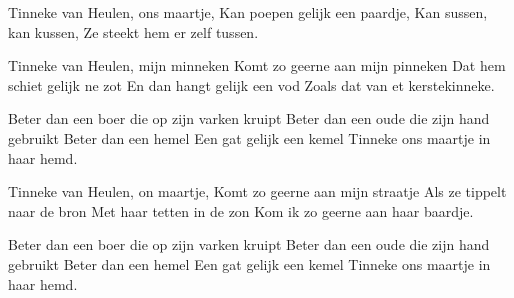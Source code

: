 \footnotemark [
ititle={Tinneke van Heulen}]


\beginverse
Tinneke van Heulen, ons maartje,
Kan poepen gelijk een paardje,
Kan sussen, kan kussen,
Ze steekt hem er zelf tussen.
\endverse

\beginverse
Tinneke van Heulen, mijn minneken
Komt zo geerne aan mijn pinneken
Dat hem schiet gelijk ne zot
En dan hangt gelijk een vod
Zoals dat van et kerstekinneke.
\endverse

\beginverse
Beter dan een boer die op zijn varken kruipt
Beter dan een oude die zijn hand gebruikt
Beter dan een hemel
Een gat gelijk een kemel
Tinneke ons maartje in haar hemd.
\endverse

\beginverse
Tinneke van Heulen, on maartje,
Komt zo geerne aan mijn straatje
Als ze tippelt naar de bron
Met haar tetten in de zon
Kom ik zo geerne aan haar baardje.
\endverse

\beginverse
Beter dan een boer die op zijn varken kruipt
Beter dan een oude die zijn hand gebruikt
Beter dan een hemel
Een gat gelijk een kemel
Tinneke ons maartje in haar hemd.
\endverse
\endsong